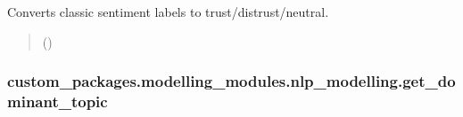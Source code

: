 \documentclass[letterpaper,10pt,english]{sphinxhowto}
\begin{document}
\begin{fulllineitems}
\label{\detokenize{_autosummary/custom_packages.modelling_modules.nlp_modelling.map_sentiment_to_trust:custom_packages.modelling_modules.nlp_modelling.map_sentiment_to_trust}}
\pysigstartsignatures
\pysiglinewithargsret
{}
{}
{}
\pysigstopsignatures
\sphinxAtStartPar
Converts classic sentiment labels to trust/distrust/neutral.
\begin{quote}\begin{description}
\sphinxAtStartPar
{} ()

\sphinxAtStartPar
{}

\end{description}\end{quote}

\end{fulllineitems}


\sphinxstepscope


\subsubsection{custom\_packages.modelling\_modules.nlp\_modelling.get\_dominant\_topic}
\label{\detokenize{_autosummary/custom_packages.modelling_modules.nlp_modelling.get_dominant_topic:custom-packages-modelling-modules-nlp-modelling-get-dominant-topic}}\label{\detokenize{_autosummary/custom_packages.modelling_modules.nlp_modelling.get_dominant_topic::doc}}
\end{document}
